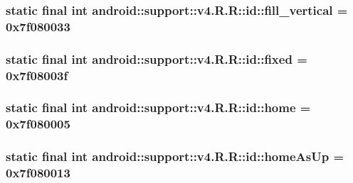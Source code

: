 \hypertarget{classandroid_1_1support_1_1v4_1_1_r_1_1id_28fde6dfc49ddb47244f3722ff0d6146}{
\subsubsection[{fill\_\-vertical}]{\setlength{\rightskip}{0pt plus 5cm}static final int android::support::v4.R.R::id::fill\_\-vertical = 0x7f080033}}
\label{classandroid_1_1support_1_1v4_1_1_r_1_1id_28fde6dfc49ddb47244f3722ff0d6146}


\hypertarget{classandroid_1_1support_1_1v4_1_1_r_1_1id_0d20bd3bb450ac867533493d3ecdb77d}{
\subsubsection[{fixed}]{\setlength{\rightskip}{0pt plus 5cm}static final int android::support::v4.R.R::id::fixed = 0x7f08003f}}
\label{classandroid_1_1support_1_1v4_1_1_r_1_1id_0d20bd3bb450ac867533493d3ecdb77d}


\hypertarget{classandroid_1_1support_1_1v4_1_1_r_1_1id_f3c4382884f800d70c2772fa97981800}{
\subsubsection[{home}]{\setlength{\rightskip}{0pt plus 5cm}static final int android::support::v4.R.R::id::home = 0x7f080005}}
\label{classandroid_1_1support_1_1v4_1_1_r_1_1id_f3c4382884f800d70c2772fa97981800}


\hypertarget{classandroid_1_1support_1_1v4_1_1_r_1_1id_43931814ce5bdd22e1559f9889efba57}{
\subsubsection[{homeAsUp}]{\setlength{\rightskip}{0pt plus 5cm}static final int android::support::v4.R.R::id::homeAsUp = 0x7f080013}}
\label{classandroid_1_1support_1_1v4_1_1_r_1_1id_43931814ce5bdd22e1559f9889efba57}


